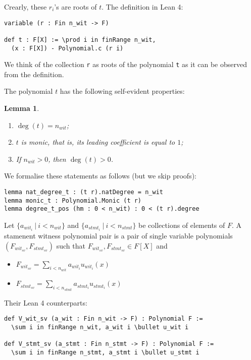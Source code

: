 \documentclass{article}
\newtheorem{lemma}{Lemma}
\theoremstyle{definition}
\theoremstyle{remark}
\begin{document}
Crearly, these $r_i$'s are roots of $t$. The definition in Lean 4:
\begin{lstlisting}
variable (r : Fin n_wit -> F)

def t : F[X] := \prod i in finRange n_wit,
  (x : F[X]) - Polynomial.c (r i)
\end{lstlisting}

We think of the collection \verb"r" as roots of the polynomial \verb"t" as it can be observed from the definition.

The polynomial $t$ has the following self-evident properties:

\begin{lemma}
$ $

\begin{enumerate}
\item $\deg(t) = n_{wit}$;
\item $t$ is monic, that is, its leading coefficient is equal to $1$;
\item If $n_{wit} > 0$, then $\deg(t) > 0$.
\end{enumerate}
\end{lemma}

We formalise these statements as follows (but we skip proofs):
\begin{lstlisting}
lemma nat_degree_t : (t r).natDegree = n_wit
lemma monic_t : Polynomial.Monic (t r)
lemma degree_t_pos (hm : 0 < n_wit) : 0 < (t r).degree
\end{lstlisting}

Let $\{ a_{{wit}_i} \: | \: i < n_{wit}\}$ and $\{ a_{{stmt}_i} \: | \: i < n_{stmt} \}$ be collections of elements of $F$. A stamenent witness polynomial pair is a pair of single variable polynomials $(F_{{wit}_{sv}}, F_{{stmt}_{sv}})$
such that $F_{{wit}_{sv}}, F_{{stmt}_{sv}} \in F[X]$ and
\begin{itemize}
\item $F_{{wit}_{sv}} = \sum \limits_{i < n_{wit}} a_{{wit}_i} u_{{wit}_{i}}(x)$
\item $F_{{stmt}_{sv}} = \sum \limits_{i < n_{stmt}} a_{{stmt}_i} u_{{stmt}_{i}}(x)$
\end{itemize}

Their Lean 4 counterparts:
\begin{lstlisting}
def V_wit_sv (a_wit : Fin n_wit -> F) : Polynomial F :=
  \sum i in finRange n_wit, a_wit i \bullet u_wit i

def V_stmt_sv (a_stmt : Fin n_stmt -> F) : Polynomial F :=
  \sum i in finRange n_stmt, a_stmt i \bullet u_stmt i
\end{lstlisting}
\end{document}
